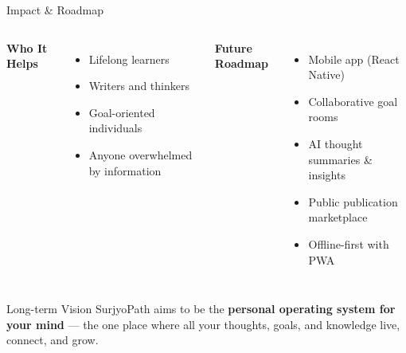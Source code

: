 \documentclass[aspectratio=43, 11pt]{beamer}
\begin{document}
\begin{frame}{\textcolor{StarGold}{Impact \& Roadmap}}

  \begin{columns}[t]
    \textcolor{Corona}{\textbf{Who It Helps}}
    \begin{itemize}
      \item[\textcolor{SunGlow}{--}] Lifelong learners
      \item[\textcolor{SunGlow}{--}] Writers and thinkers
      \item[\textcolor{SunGlow}{--}] Goal-oriented individuals
      \item[\textcolor{SunGlow}{--}] Anyone overwhelmed by information
    \end{itemize}

    \textcolor{Corona}{\textbf{Future Roadmap}}
    \begin{itemize}
      \item[\textcolor{NebulaTeal}{$\blacktriangleright$}] Mobile app (React Native)
      \item[\textcolor{NebulaTeal}{$\blacktriangleright$}] Collaborative goal rooms
      \item[\textcolor{NebulaTeal}{$\blacktriangleright$}] AI thought summaries \& insights
      \item[\textcolor{NebulaTeal}{$\blacktriangleright$}] Public publication marketplace
      \item[\textcolor{NebulaTeal}{$\blacktriangleright$}] Offline-first with PWA
    \end{itemize}
  \end{columns}

  \vspace{0.6cm}
  \begin{exampleblock}{\textcolor{NebulaTeal}{Long-term Vision}}
    \centering
    \small
    SurjyoPath aims to be the \textbf{personal operating system for your mind} --- the one place where all your thoughts, goals, and knowledge live, connect, and grow.
  \end{exampleblock}
\end{frame}
\end{document}
